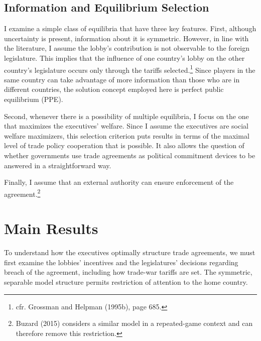 \documentclass[10pt]{article}
\begin{document}
\subsection{Information and Equilibrium Selection}
\label{sec:info}
I examine a simple class of equilibria that have three key features. First, although uncertainty is present, information about it is symmetric. However, in line with the literature, I assume the lobby's contribution is not observable to the foreign legislature. This implies that the influence of one country's lobby on the other country's legislature occurs only through the tariffs selected.\footnote{cfr. Grossman and Helpman (1995b), page 685.} Since players in the same country can take advantage of more information than those who are in different countries, the solution concept employed here is perfect public equilibrium (PPE).

Second, whenever there is a possibility of multiple equilibria, I focus on the one that maximizes the executives' welfare. Since I assume the executives are social welfare maximizers, this selection criterion puts results in terms of the maximal level of trade policy cooperation that is possible. It also allows the question of whether governments use trade agreements as political commitment devices to be answered in a straightforward way.

Finally, I assume that an external authority can ensure enforcement of the agreement.\footnote{Buzard (2015) considers a similar model in a repeated-game context and can therefore remove this restriction.} 


\section{Main Results}
\label{sec:main}
To understand how the executives optimally structure trade agreements, we must first examine the lobbies' incentives and the legislatures' decisions regarding breach of the agreement, including how trade-war tariffs are set. The symmetric, separable model structure permits restriction of attention to the home country.
\end{document}
